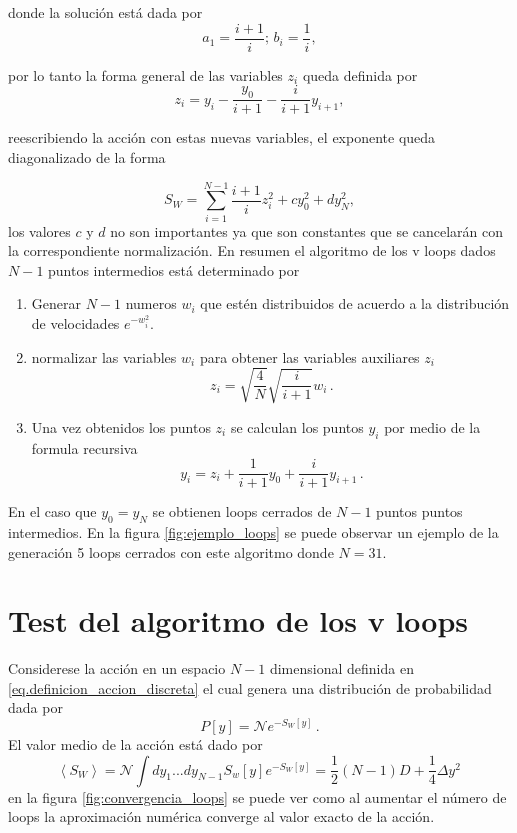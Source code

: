 donde la solución está dada por
\begin{equation}
a _1 = \frac{i+1}{i} ; \, b_i = \frac{1}{i} ,
\end{equation}

por lo tanto la forma general de las variables $z _i$ queda definida por
\begin{equation}
z _i = y _i - \frac{y_0}{i+1} - \frac{i}{i+1} y _{i+1} ,
\end{equation}

reescribiendo la acción con estas nuevas variables, el exponente queda diagonalizado de la forma

\begin{equation}
S _{W}  = \sum _{i = 1} ^{N-1} \frac{i +1}{i} z _i ^2 + c y _0 ^2 + d y _N ^2
, 
\end{equation}
los valores $c$ y $d$ no son importantes ya que son constantes que se cancelarán con la correspondiente normalización.
En resumen el algoritmo de los v loops dados $N-1$ puntos intermedios está determinado por 
\begin{enumerate}
\item Generar $N-1$ numeros $w_i$ que estén distribuidos de acuerdo a la distribución de velocidades $e^{- w _{i} ^2}$.
\item normalizar las variables $w _i$ para obtener las variables auxiliares $z _i$
	\begin{equation}
	z _i = \sqrt{\frac{4}{N}} \sqrt{\frac{i}{i+1}} w _i
	\, .
	\end{equation}

\item Una vez obtenidos los puntos $ z_i$ se calculan los puntos $ y_i$ por medio de la formula recursiva
	\begin{equation}
	y _i = z _i + \frac{1}{i+1} y_0 + \frac{i}{i+1} y _{i+1} \, .
	\end{equation}
\end{enumerate}
En el caso que $y_0 = y _N$ se obtienen loops cerrados de $N-1$ puntos puntos intermedios.
En la figura \ref{fig:ejemplo_loops} se puede observar un ejemplo de la generación 5 loops cerrados con este algoritmo donde $N=31$.


\section{Test del algoritmo de los v loops}


Considerese la acción en un espacio $N-1$ dimensional definida en \eqref{eq.definicion_accion_discreta} el cual genera una distribución de probabilidad dada por 
\begin{equation}
P [y] = \mathcal{N} e^{-S _{W} [y]}
\, .
\end{equation}
El valor medio de la acción está dado por
\begin{equation}
\left< S _W \right> = 
\mathcal{N} \int dy _1 ... dy _{N-1} S _w [y] e^{-S _{W} [y]} =
\frac{1}{2} (N-1) D + \frac{1}{4} \Delta y ^2 
\,
\end{equation}
en la figura \ref{fig:convergencia_loops} se puede ver como al aumentar el número de loops la aproximación numérica converge al valor exacto de la acción. \\



